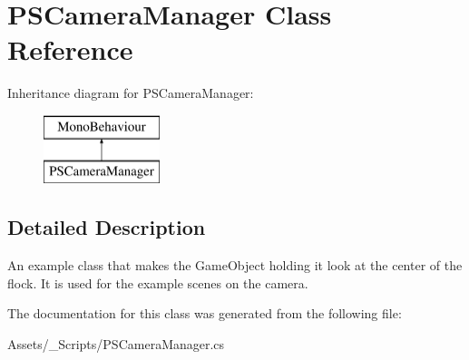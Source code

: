 \hypertarget{class_p_s_camera_manager}{}\section{P\+S\+Camera\+Manager Class Reference}
\label{class_p_s_camera_manager}
Inheritance diagram for P\+S\+Camera\+Manager\+:\begin{figure}[H]
\begin{center}
\leavevmode
\includegraphics[height=2.000000cm]{class_p_s_camera_manager}
\end{center}
\end{figure}


\subsection{Detailed Description}
An example class that makes the Game\+Object holding it look at the center of the flock. It is used for the example scenes on the camera. 

The documentation for this class was generated from the following file\+:\begin{DoxyCompactItemize}
\item 
Assets/\+\_\+\+Scripts/P\+S\+Camera\+Manager.\+cs\end{DoxyCompactItemize}
